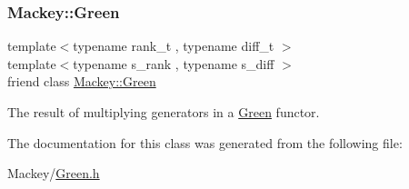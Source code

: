 \subsubsection{\texorpdfstring{Mackey\+::\+Green}{Mackey::Green}}
{\footnotesize\ttfamily template$<$typename rank\+\_\+t , typename diff\+\_\+t $>$ \\
template$<$typename s\+\_\+rank , typename s\+\_\+diff $>$ \\
friend class \hyperlink{classMackey_1_1Green}{Mackey\+::\+Green}\hspace{0.3cm}{\ttfamily [friend]}}



The result of multiplying generators in a \hyperlink{classMackey_1_1Green}{Green} functor. 



The documentation for this class was generated from the following file\+:\begin{DoxyCompactItemize}
\item 
Mackey/\hyperlink{Green_8h}{Green.\+h}\end{DoxyCompactItemize}
